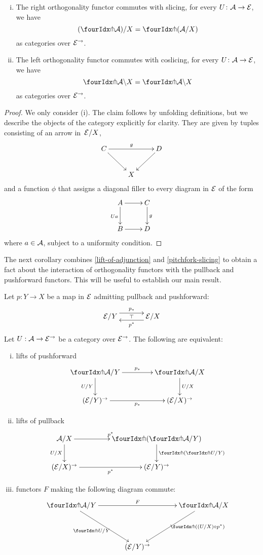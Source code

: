 \documentclass[reqno,10pt,a4paper,oneside]{amsart}
\begin{document}
\begin{proposition} \hfill 
\label{pitchfork-slicing}
\begin{enumerate}[(i)]
\item The right orthogonality functor commutes with slicing, \ie for every $U \co \cal{A} \to \cal{E}$, we have
\[
  (\liftr{\cal{A}})/X = \liftr{(\cal{A}/X)}
\]
as categories over $\cal{E}^\to$.
\item The left orthogonality functor commutes with coslicing, \ie for every $U \co \cal{A} \to \cal{E}$, we have
\[
 \liftl{\cal{A}} \backslash X = \liftl{\cal{A} \backslash X}
\]
as categories over $\cal{E}^\to$.
\end{enumerate}
\end{proposition}

\begin{proof} We only consider (i). The claim follows by unfolding definitions, but we describe the objects of the category explicitly for clarity. They are given by 
tuples consisting of an arrow in~$\cal{E}/X$, 
\[
\xymatrix{
C \ar[dr] \ar[rr]^g  &  & D \ar[dl] \\
 & X & }
 \]
and a function $\phi$ that assigns a diagonal filler to every diagram in $\cal{E}$ of the form
\[
\xymatrix{
A \ar[r] \ar[d]_{Ua} & C \ar[d]^g \\
B \ar[r] & D}
\]
where $a \in \cal{A}$, subject to a uniformity condition. 
\end{proof}

The next corollary combines \cref{lift-of-adjunction} and \cref{pitchfork-slicing} to obtain 
a fact about the interaction of orthogonality functors with the pullback and pushforward
functors. This will be useful to establish our main result.

\begin{corollary}
\label{lift-dependent-product}
Let $p : Y \to X$ be a map in $\catE$ admitting pullback and pushforward:
\[
\xymatrix@C+1em{
  \catE/Y
  \ar@<5pt>[r]^{p_*}
  \ar@{}[r]|{\top}
&
  \catE/X
  \ar@<5pt>[l]^{p^*}
}
\]
Let $U : \cal{A} \to \catE^{\to}$ be a category over $\catE^{\to}$. The following are
equivalent:
\begin{enumerate}[(i)]
\item lifts of pushforward
\[
\xymatrix@C=1.5cm{
\liftr{\cal{A}}/Y
\ar[r]^{p_*}
  \ar[d]_{U/Y}
&
  \liftr{\cal{A}}/X
  \ar[d]^{U/X}
\\
  (\catE/Y)^{\to}
   \ar[r]_{p_*}
&
  (\catE/X)^{\to}
 }
\]
\item lifts of pullback
\[
\xymatrix@C=1.5cm{
  \cal{A}/X
   \ar[r]^{p^*}
  \ar[d]_{U/X} 
  &
  \liftl{ ( \liftr{\cal{A}}/Y ) }
  \ar[d]^{\liftl{(\liftr{U}/Y)}}
     \\
     (\catE/X)^{\to} \ar[r]_{p^*} &
   (\catE/Y)^{\to} 
}
\]
\item functors $F$ making the following diagram commute:
\[
\xymatrix@C=1.2cm@R=1.5cm{
\liftr{\cal{A}}/Y \ar[rr]^F \ar[dr]_{\liftr{U}/Y} & &  \liftr{\cal{A}}/ X \ar[dl]^(.4){\ \liftr{( (U/X) \cc p^*)}}  \\
 & (\cal{E}/Y)^\to & }
\]
\end{enumerate}
\end{corollary}
\end{document}
